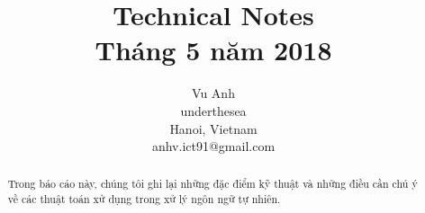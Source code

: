 \documentclass[11pt,a4paper]{books}
\title{Technical Notes\\ \small{Tháng 5 năm 2018}}
\author{
Vu Anh\\
underthesea\\
Hanoi, Vietnam\\
anhv.ict91@gmail.com
}
\date{}
\begin{document}
\maketitle
\begin{abstract}
Trong báo cáo này, chúng tôi ghi lại những đặc điểm kỹ thuật và những điều cần chú ý về các thuật toán xử dụng trong xử lý ngôn ngữ tự nhiên.

\end{abstract}
\end{document}
